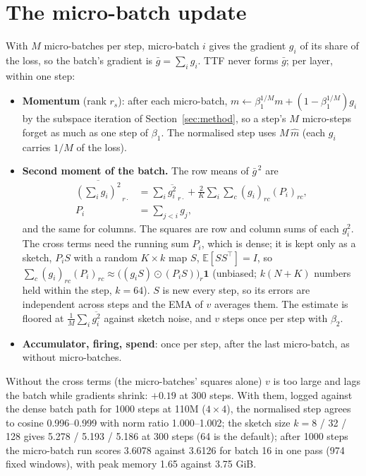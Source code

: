 \documentclass[10pt,twocolumn]{article}
\begin{document}
\section{The micro-batch update}\label{app:micro}
With $M$ micro-batches per step, micro-batch $i$ gives the gradient $g_i$ of its share of the loss, so the batch's
gradient is $\bar g=\sum_i g_i$. TTF never forms $\bar g$; per layer, within one step:
\begin{itemize}
\item \textbf{Momentum} (rank $r_s$): after each micro-batch, $m\leftarrow\beta_1^{1/M}m+(1-\beta_1^{1/M})g_i$ by the
  subspace iteration of Section~\ref{sec:method}, so a step's $M$ micro-steps forget as much as one step of $\beta_1$. The
  normalised step uses $M\,\hat m$ (each $g_i$ carries $1/M$ of the loss).
\item \textbf{Second moment of the batch.} The row means of $\bar g^{\,2}$ are
  \begin{equation}
    \begin{split}
    \overline{(\textstyle\sum_i g_i)^2}_{\,r\cdot}&=\sum_i\overline{g_i^2}_{\,r\cdot}
      +\frac2K\sum_i\sum_c (g_i)_{rc}(P_{i})_{rc},\\
    P_i&=\textstyle\sum_{j<i}g_j ,
    \end{split}
  \end{equation}
  and the same for columns. The squares are row and column sums of each $g_i^2$. The cross terms need the running sum
  $P_i$, which is dense; it is kept only as a sketch, $P_iS$ with a random $K\times k$ map $S$, $\mathbb E[SS^\top]=I$,
  so $\sum_c (g_i)_{rc}(P_i)_{rc}\approx\big((g_iS)\odot(P_iS)\big)_{r}\mathbf 1$ (unbiased; $k(N+K)$ numbers held within
  the step, $k=64$). $S$ is new every step, so its errors are independent across steps and the EMA of $v$ averages them.
  The estimate is floored at $\frac1M\sum_i\overline{g_i^2}$ against sketch noise, and $v$ steps once per step with
  $\beta_2$.
\item \textbf{Accumulator, firing, spend}: once per step, after the last micro-batch, as without micro-batches.
\end{itemize}
Without the cross terms (the micro-batches' squares alone) $v$ is too large and lags the batch while gradients shrink:
$+0.19$ at 300 steps. With them, logged against the dense batch path for 1000 steps at 110M ($4\times4$), the normalised
step agrees to cosine 0.996--0.999 with norm ratio 1.000--1.002; the sketch size $k=8$ / 32 / 128 gives 5.278 / 5.193 /
5.186 at 300 steps (64 is the default); after 1000 steps the micro-batch run scores 3.6078 against 3.6126 for batch 16 in
one pass (974 fixed windows), with peak memory 1.65 against 3.75 GiB.
\end{document}
